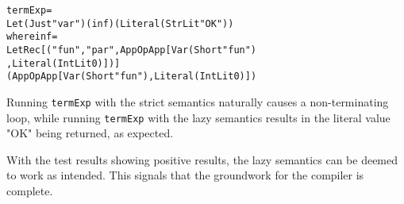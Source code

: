 \begin{alltt}
  termExp =
    Let (Just "var") (inf) (Literal (StrLit "OK"))
    where inf =
      LetRec [("fun", "par", App OpApp [Var (Short "fun")
                                       ,Literal (IntLit 0)])]
      (App OpApp [Var (Short "fun"), Literal (IntLit 0)])
\end{alltt}

\noindent Running \texttt{termExp} with the strict semantics naturally causes a
non-terminating loop, while running \texttt{termExp} with the lazy semantics
results in the literal value "OK" being returned, as expected.

With the test results showing positive results, the lazy semantics can be deemed
to work as intended. This signals that the groundwork for the compiler is
complete.
